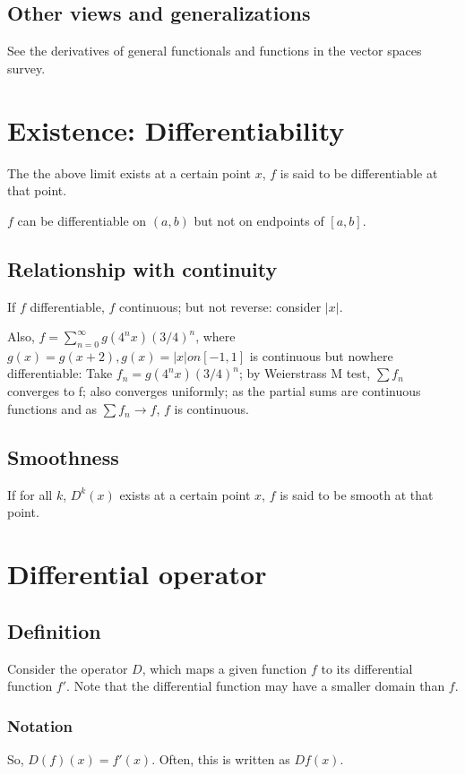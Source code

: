 \documentclass[oneside, article]{memoir}
\begin{document}
\subsection{Other views and generalizations}
See the derivatives of general functionals and functions in the vector spaces survey.

\section{Existence: Differentiability}
The the above limit exists at a certain point $x$, $f$ is said to be differentiable at that point.

$f$ can be differentiable on $(a, b)$ but not on endpoints of $[a, b]$.

\subsection{Relationship with continuity}
If $f$ differentiable, $f$ continuous; but not reverse: consider $|x|$.

Also, $f = \sum_{n=0}^{\infty} g(4^{n}x) (3/4)^{n}$, where $g(x) = g(x+2), g(x) = |x| on [-1, 1]$ is continuous but nowhere differentiable: Take $f_{n}= g(4^{n}x) (3/4)^{n}$; by Weierstrass M test, $\sum f_{n}$ converges to f; also converges uniformly; as the partial sums are continuous functions and as $\sum f_{n} \to f$, $f$ is continuous.

\subsection{Smoothness}
If for all $k$, $D^k(x)$ exists at a certain point $x$, $f$ is said to be smooth at that point.

\section{Differential operator}
\subsection{Definition}
Consider the operator $D$, which maps a given function $f$ to its differential function $f'$. Note that the differential function may have a smaller domain than $f$.

\subsubsection{Notation}
So, $D(f)(x) = f'(x)$. Often, this is written as $Df(x)$.
\end{document}
